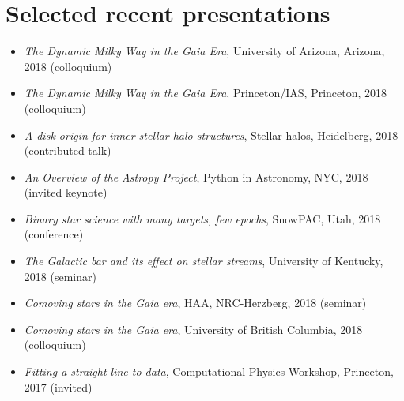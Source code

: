 \documentclass[12pt, letterpaper]{apw-cv}
\begin{document}
\section*{Selected recent presentations}

\begin{itemize}
    \item \emph{The Dynamic Milky Way in the Gaia Era}, University of Arizona, Arizona, 2018 (colloquium)
    \item \emph{The Dynamic Milky Way in the Gaia Era}, Princeton/IAS, Princeton, 2018 (colloquium)
    \item \emph{A disk origin for inner stellar halo structures}, Stellar halos, Heidelberg, 2018 (contributed talk)
    \item \emph{An Overview of the Astropy Project}, Python in Astronomy, NYC, 2018 (invited keynote)
    \item \emph{Binary star science with many targets, few epochs}, SnowPAC, Utah, 2018 (conference)
    \item \emph{The Galactic bar and its effect on stellar streams}, University of Kentucky, 2018 (seminar)
    \item \emph{Comoving stars in the Gaia era}, HAA, NRC-Herzberg, 2018 (seminar)
    \item \emph{Comoving stars in the Gaia era}, University of British Columbia, 2018 (colloquium)
    \item \emph{Fitting a straight line to data}, Computational Physics Workshop, Princeton, 2017 (invited)

\end{itemize}
\end{document}
